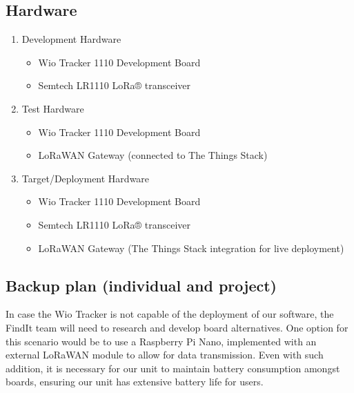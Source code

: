 \subsection{Hardware}
\begin{enumerate}
\item Development Hardware 
    \begin{itemize}
        \item Wio Tracker 1110 Development Board
        \item Semtech LR1110 LoRa® transceiver
    \end{itemize}

\item Test Hardware 
    \begin{itemize}
        \item Wio Tracker 1110 Development Board
        \item LoRaWAN Gateway (connected to The Things Stack)
    \end{itemize}

\item Target/Deployment Hardware 
    \begin{itemize}
        \item Wio Tracker 1110 Development Board
        \item Semtech LR1110 LoRa® transceiver
        \item LoRaWAN Gateway (The Things Stack integration for live deployment)
    \end{itemize}
\end{enumerate}


\subsection{Backup plan (individual and project)} 

In case the Wio Tracker is not capable of the deployment of our software, the FindIt team will need to research and develop board alternatives. One option for this scenario would be to use a Raspberry Pi Nano, implemented with an external LoRaWAN module to allow for data transmission. Even with such addition, it is necessary for our unit to maintain battery consumption amongst boards, ensuring our unit has extensive battery life for users.

